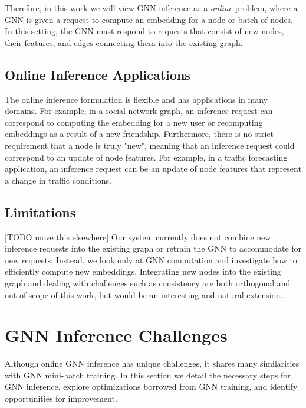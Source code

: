 Therefore, in this work we will view GNN inference as a \textit{online} problem, where a GNN is given a request to compute an embedding for a node or batch of nodes. In this setting, the GNN must respond to requests that consist of new nodes, their features, and edges connecting them into the existing graph.

\subsection{Online Inference Applications}
The online inference formulation is flexible and has applications in many domains.
For example, in a social network graph, an inference request can correspond to computing the embedding for a new user or recomputing embeddings as a result of a new friendship. 
Furthermore, there is no strict requirement that a node is truly "new", meaning that an inference request could correspond to an update of node features.
For example, in a traffic forecasting application, an inference request can be an update of node features that represent a change in traffic conditions.

\subsection{Limitations}
[TODO move this elsewhere]
Our system currently does not combine new inference requests into the existing graph or retrain the GNN to accommodate for new requests. 
Instead, we look only at GNN computation and investigate how to efficiently compute new embeddings. 
Integrating new nodes into the existing graph and dealing with challenges such as consistency are both orthogonal and out of scope of this work, but would be an interesting and natural extension.

\section{GNN Inference Challenges}

Although online GNN inference has unique challenges, it shares many similarities with GNN mini-batch training.
In this section we detail the necessary steps for GNN inference, explore optimizations borrowed from GNN training, and identify opportunities for improvement.


